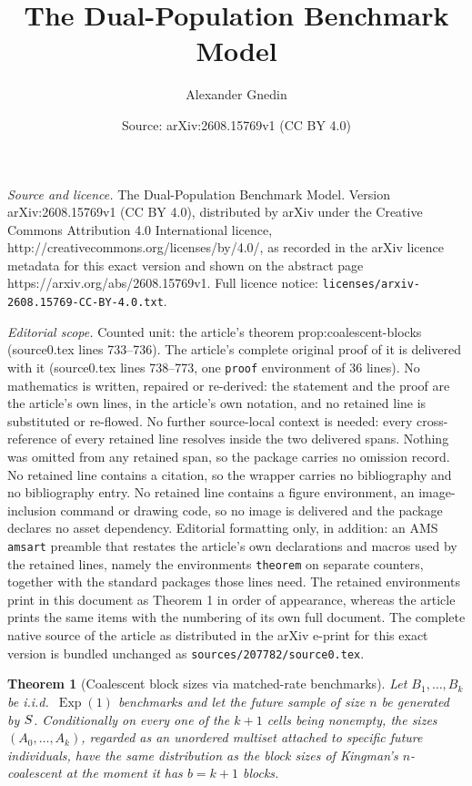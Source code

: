 \documentclass[10pt,a4paper]{amsart}
\title{The Dual-Population Benchmark Model}
\author{Alexander Gnedin}
\date{Source: arXiv:2608.15769v1 (CC BY 4.0)}
\newtheorem{theorem}{Theorem}
\DeclareMathOperator{\Exp}{Exp}
\begin{document}
\maketitle

\noindent\emph{Source and licence.} The Dual-Population Benchmark Model. Version arXiv:2608.15769v1 (CC BY 4.0), distributed by arXiv under the Creative Commons Attribution 4.0 International licence, http://creativecommons.org/licenses/by/4.0/, as recorded in the arXiv licence metadata for this exact version and shown on the abstract page https://arxiv.org/abs/2608.15769v1. Full licence notice: \texttt{licenses/arxiv-2608.15769-CC-BY-4.0.txt}.\par\smallskip

\noindent\textit{Editorial scope.} Counted unit: the article's theorem prop:coalescent-blocks (source0.tex lines 733--736). The article's complete original proof of it is delivered with it (source0.tex lines 738--773, one \texttt{proof} environment of 36 lines). No mathematics is written, repaired or re-derived: the statement and the proof are the article's own lines, in the article's own notation, and no retained line is substituted or re-flowed.  No further source-local context is needed: every cross-reference of every retained line resolves inside the two delivered spans.  Nothing was omitted from any retained span, so the package carries no omission record.  No retained line contains a citation, so the wrapper carries no bibliography and no bibliography entry.  No retained line contains a figure environment, an image-inclusion command or drawing code, so no image is delivered and the package declares no asset dependency.  Editorial formatting only, in addition: an AMS \texttt{amsart} preamble that restates the article's own declarations and macros used by the retained lines, namely the environments \texttt{theorem} on separate counters, together with the standard packages those lines need.  The retained environments print in this document as Theorem 1 in order of appearance, whereas the article prints the same items with the numbering of its own full document.  The complete native source of the article as distributed in the arXiv e-print for this exact version is bundled unchanged as \texttt{sources/207782/source0.tex}.
\begin{theorem}[Coalescent block sizes via matched-rate benchmarks]
\label{prop:coalescent-blocks}
Let \(B_1,\dots,B_k\) be i.i.d.\ \(\Exp(1)\) benchmarks and let the future sample of size \(n\) be generated by \({\rm S}\). Conditionally on every one of the \(k+1\) cells being nonempty, the sizes \((A_0,\dots,A_k)\), regarded as an unordered multiset attached to specific future individuals, have  the same distribution as the block sizes of Kingman's \(n\)-coalescent at the moment it has \(b=k+1\) blocks.
\end{theorem}
\end{document}
